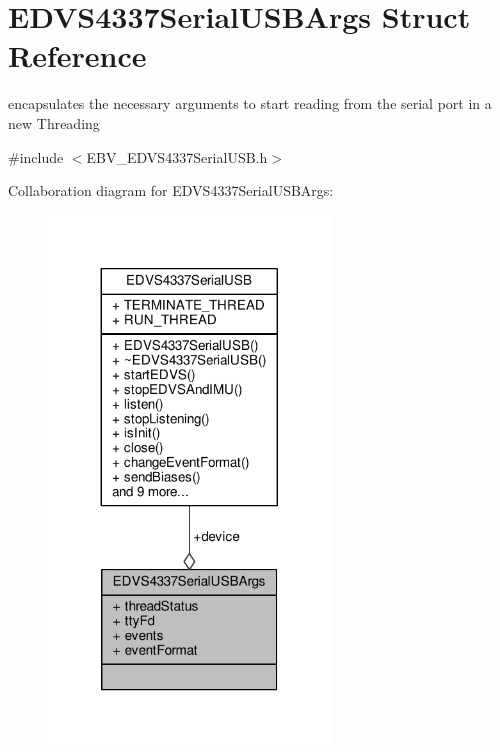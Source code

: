 \hypertarget{struct_e_d_v_s4337_serial_u_s_b_args}{}\section{E\+D\+V\+S4337\+Serial\+U\+S\+B\+Args Struct Reference}
\label{struct_e_d_v_s4337_serial_u_s_b_args}


encapsulates the necessary arguments to start reading from the serial port in a new Threading  




{\ttfamily \#include $<$E\+B\+V\+\_\+\+E\+D\+V\+S4337\+Serial\+U\+S\+B.\+h$>$}



Collaboration diagram for E\+D\+V\+S4337\+Serial\+U\+S\+B\+Args\+:
\nopagebreak
\begin{figure}[H]
\begin{center}
\leavevmode
\includegraphics[width=212pt]{struct_e_d_v_s4337_serial_u_s_b_args__coll__graph}
\end{center}
\end{figure}
